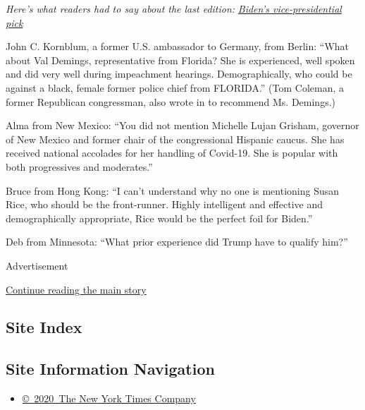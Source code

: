 \emph{Here's what readers had to say about the last edition:}
\href{https://www.nytimes3xbfgragh.onion/2020/04/28/opinion/biden-vice-president.html}{\emph{Biden's
vice-presidential pick}}

John C. Kornblum, a former U.S. ambassador to Germany, from Berlin:
``What about Val Demings, representative from Florida? She is
experienced, well spoken and did very well during impeachment hearings.
Demographically, who could be against a black, female former police
chief from FLORIDA.'' (Tom Coleman, a former Republican congressman,
also wrote in to recommend Ms. Demings.)

Alma from New Mexico: ``You did not mention Michelle Lujan Grisham,
governor of New Mexico and former chair of the congressional Hispanic
caucus. She has received national accolades for her handling of
Covid-19. She is popular with both progressives and moderates.''

Bruce from Hong Kong: ``I can't understand why no one is mentioning
Susan Rice, who should be the front-runner. Highly intelligent and
effective and demographically appropriate, Rice would be the perfect
foil for Biden.''

Deb from Minnesota: ``What prior experience did Trump have to qualify
him?''

Advertisement

\protect\hyperlink{after-bottom}{Continue reading the main story}

\hypertarget{site-index}{%
\subsection{Site Index}\label{site-index}}

\hypertarget{site-information-navigation}{%
\subsection{Site Information
Navigation}\label{site-information-navigation}}

\begin{itemize}
\tightlist
\item
  \href{https://help.nytimes3xbfgragh.onion/hc/en-us/articles/115014792127-Copyright-notice}{©~2020~The
  New York Times Company}
\end{itemize}


